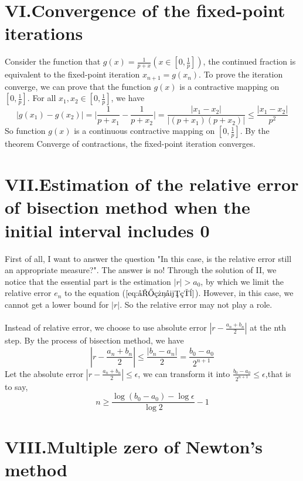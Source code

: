 \documentclass[a4paper]{article}
\begin{document}
\section*{VI.Convergence of the fixed-point iterations}
Consider the function that $g(x)=\frac{1}{p+x} (x\in [0,\frac{1}{p}])$, the continued fraction is equivalent to the fixed-point iteration $x_{n+1}=g(x_n)$. To prove the iteration converge, we can prove that the function $g(x)$ is a contractive mapping on
$[0,\frac{1}{p}]$. For all $x_1,x_2\in[0,\frac{1}{p}]$, we have
\begin{equation}
    \big|g(x_1)-g(x_2)\big|=\big|\frac{1}{p+x_1}-\frac{1}{p+x_2}\big|=\frac{|x_1-x_2|}{|(p+x_1)(p+x_2)|}\leq \frac{|x_1-x_2|}{p^2}
\end{equation}
So function $g(x)$ is a continuous contractive mapping on $[0,\frac{1}{p}]$. By the theorem Converge of contractions, the fixed-point iteration converges.
\section*{VII.Estimation of the relative error of bisection method when the initial interval includes 0}
First of all, I want to answer the question "In this case, is the relative error still an appropriate measure?". The answer is no! Through the solution of II, we notice that the essential part is the estimation $|r|>a_0$, by which we limit the relative error $e_n$ to the equation ($\ref{eq:后续引用}$). However, in this case, we cannot get a lower bound for $|r|$. So the relative error may not play a role.\\
\\
Instead of relative error, we choose to use absolute error $|r-\frac{a_n+b_n}{2}|$ at the nth step. By the process of bisection method, we have
\begin{equation}
    |r-\frac{a_n+b_n}{2}|\leq \frac{|b_n-a_n|}{2}=\frac{b_0-a_0}{2^{n+1}}    
\end{equation}
Let the absolute error $|r-\frac{a_n+b_n}{2}|\leq\epsilon$, we can transform it into $\frac{b_0-a_0}{2^{n+1}}\leq\epsilon$,that is to say,
\begin{equation}
    n\geq \frac{\log(b_0-a_0)-\log \epsilon}{\log 2}-1
\end{equation}

\section*{VIII.Multiple zero of Newton's method}
\end{document}
